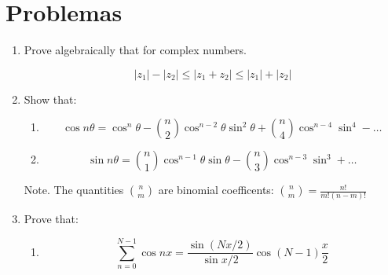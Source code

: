 \documentclass[12pt,spanish]{article}
\title{\Large \bf \Titulo}
\author{}
\date{}
\begin{document}
\thispagestyle{fancy}
\maketitle
\thispagestyle{plain}
\let\oldthefootnote\thefootnote

\let\thefootnote\oldthefootnote
\setlength{\headheight}{0.65in}
\setlength{\textheight}{8.60in}
\pagestyle{myheadings}

\vspace{-2cm}

\section*{Problemas}

\begin{enumerate}
    \item  Prove algebraically that for complex numbers.
    
    \begin{equation*}
        |z_1| - |z_2| \leq |z_1 + z_2| \leq |z_1| + |z_2|
    \end{equation*}

    \item Show that:

    \begin{enumerate}
        \item     
            \begin{equation*}
                \cos{n\theta} = \cos^n\theta - \binom{n}{2}\cos^{n-2}\theta\sin^2\theta + \binom{n}{4}\cos^{n-4}\sin^{4} - \dots 
            \end{equation*}
            
        \item 
            \begin{equation*}
                \sin{n\theta} = \binom{n}{1}\cos^{n-1}\theta\sin\theta - \binom{n}{3}\cos^{n-3}\sin^{3} + \dots 
            \end{equation*}
    \end{enumerate}

    Note. The quantities $\binom{n}{m}$ are binomial coefficents: $\binom{n}{m} = \frac{n!}{m!(n-m)!}$

    \item  Prove that:
    
    \begin{enumerate}
        \item
            \begin{equation*}
                \sum_{n = 0}^{ N - 1} \cos{nx} = \frac{\sin{(Nx/2)}}{\sin{x/2}}\cos{(N-1)}\frac{x}{2}
            \end{equation*}
    

\end{enumerate}
\end{enumerate}
\end{document}
